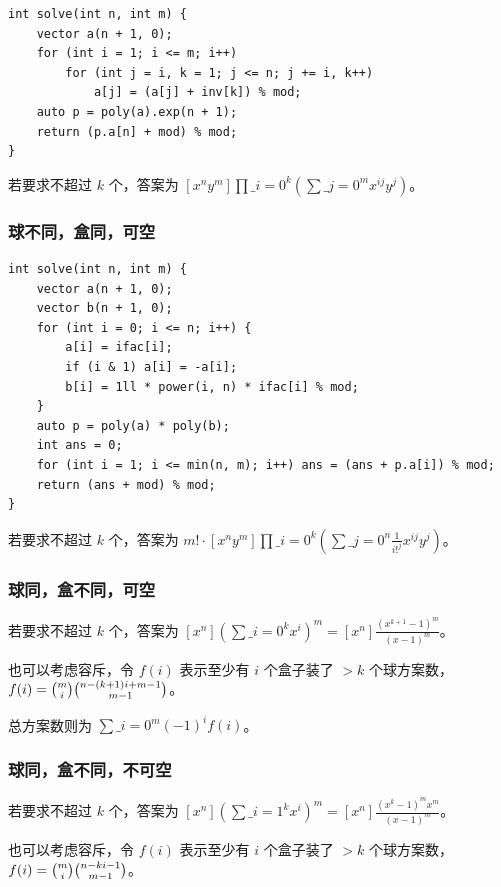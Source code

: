 \documentclass[UTF8]{ctexart}
\begin{document}
\begin{sloppypar}
\begin{lstlisting}[style=cpp]
int solve(int n, int m) {
    vector a(n + 1, 0);
    for (int i = 1; i <= m; i++)
        for (int j = i, k = 1; j <= n; j += i, k++)
            a[j] = (a[j] + inv[k]) % mod;
    auto p = poly(a).exp(n + 1);
    return (p.a[n] + mod) % mod;
}
\end{lstlisting}

若要求不超过  $k$ 个，答案为 $[x^ny^m]\prod\limits\_{i=0}^k \left(\sum\limits\_{j=0}^m x^{ij}y^j\right)$。

\subsubsection{球不同，盒同，可空}

\begin{lstlisting}[style=cpp]
int solve(int n, int m) {
    vector a(n + 1, 0);
    vector b(n + 1, 0);
    for (int i = 0; i <= n; i++) {
        a[i] = ifac[i];
        if (i & 1) a[i] = -a[i];
        b[i] = 1ll * power(i, n) * ifac[i] % mod;
    }
    auto p = poly(a) * poly(b);
    int ans = 0;
    for (int i = 1; i <= min(n, m); i++) ans = (ans + p.a[i]) % mod;
    return (ans + mod) % mod;
}
\end{lstlisting}

若要求不超过  $k$ 个，答案为 $m! \cdot [x^ny^m]\prod\limits\_{i=0}^k \left(\sum\limits\_{j=0}^n\frac{1}{i!^j} x^{ij}y^j\right)$。

\subsubsection{球同，盒不同，可空}

若要求不超过  $k$ 个，答案为 $[x^n]\left(\sum\limits\_{i=0}^kx^i\right)^m = [x^n]\frac{(x^{k+1}-1)^m}{(x-1)^m}$。

也可以考虑容斥，令 $f(i)$ 表示至少有 $i$ 个盒子装了 $>k$ 个球方案数，$f(i) = \tbinom{m}{i}\tbinom{n-(k+1)i+m-1}{m-1}$。

总方案数则为 $\sum\limits\_{i=0}^{m}(-1)^if(i)$。

\subsubsection{球同，盒不同，不可空}

若要求不超过  $k$ 个，答案为 $[x^n]\left(\sum\limits\_{i=1}^kx^i\right)^m = [x^n]\frac{(x^k-1)^mx^m}{(x-1)^m}$。

也可以考虑容斥，令 $f(i)$ 表示至少有 $i$ 个盒子装了 $>k$ 个球方案数，$f(i) = \tbinom{m}{i}\tbinom{n-ki-1}{m-1}$。


\end{sloppypar}
\end{document}
